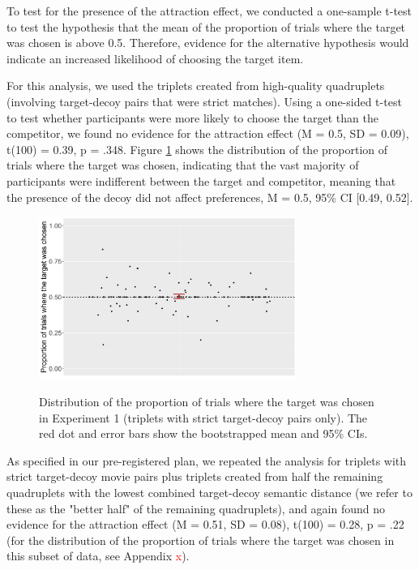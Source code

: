 \documentclass[11pt,a4paper]{article}
\begin{document}

To test for the presence of the attraction effect, we conducted a one-sample t-test to test the hypothesis that the mean of the proportion of trials where the target was chosen  is above 0.5. Therefore, evidence for the alternative hypothesis would indicate an increased likelihood of choosing the target item. 

For this analysis, we used the triplets created from high-quality quadruplets (involving target-decoy pairs that were strict matches). Using a one-sided t-test to test whether participants were more likely to choose the target than the competitor, we found no evidence for the attraction effect (M = 0.5, SD = 0.09), t(100) = 0.39, p = .348. Figure \ref{fig:exp1_t_test} shows the distribution of the proportion of trials where the target was chosen, indicating that the vast majority of participants were indifferent between the target and competitor, meaning that the presence of the decoy did not affect preferences, M = 0.5, 95\% CI [0.49, 0.52].

\begin{figure}[H]
\captionsetup{justification=centering}
\centering
\caption{Distribution of the proportion of trials where the target was chosen in Experiment 1 (triplets with strict target-decoy pairs only). The red dot and error bars show the bootstrapped mean and 95\% CIs.}
\includegraphics[width=0.75\textwidth]{exp1_highqual.png}
\label{fig:exp1_t_test}
\end{figure}

As specified in our pre-registered plan, we repeated the analysis for triplets with strict target-decoy movie pairs plus triplets created from half the remaining quadruplets with the lowest combined target-decoy semantic distance (we refer to these as the "better half" of the remaining quadruplets), and again found no evidence for the attraction effect (M = 0.51, SD = 0.08), t(100) = 0.28, p = .22 (for the distribution of the proportion of trials where the target was chosen in this subset of data, see Appendix \textcolor{red}{x}). 
\end{document}
